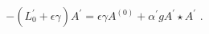 \begin{equation}
-(L_{0}^{\prime }+\epsilon \gamma )A^{\prime }=\epsilon \gamma A^{\left(
0\right) }+{\alpha ^{\prime }}gA^{\prime }\star A^{\prime }\,\,.
\end{equation}%
